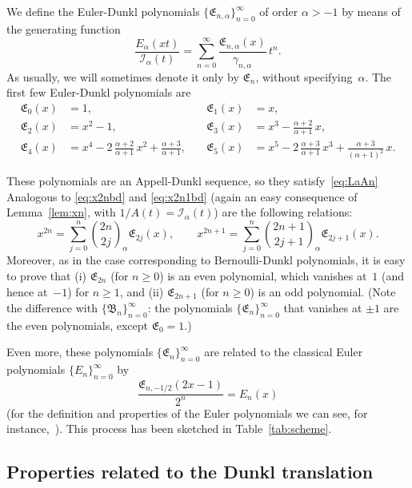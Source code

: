 \documentclass[10pt]{article}
\theoremstyle{plain}
\theoremstyle{definition}
\numberwithin{equation}{section} %
\newcommand{\Ea}{E_{\alpha}}
\newcommand{\binoma}[2]{\binom{#1}{#2}_{\!\alpha}}
\newcommand{\I}{\mathcal{I}}
\newcommand{\B}{\mathfrak{B}}
\newcommand{\E}{\mathfrak{E}}
\newcommand{\cc}{\gamma}
\begin{document}
We define the Euler-Dunkl polynomials $\{\E_{n,\alpha}\}_{n=0}^{\infty}$ of order $\alpha>-1$ by means of the generating function
\begin{equation*}
  \frac{\Ea(xt)}{\I_{\alpha}(t)}
  = \sum_{n=0}^\infty \frac{\E_{n,\alpha}(x)}{\cc_{n,\alpha}} \,t^n.
\end{equation*}
As usually, we will sometimes denote it only by $\E_{n}$, without specifying~$\alpha$.
The first few Euler-Dunkl polynomials are
\begin{align*}
  \E_0(x) &= 1, \quad & \E_1(x) &= x, \\
  \E_2(x) &= x^2-1, \quad &
  \E_3(x) &= x^3 - \frac{\alpha+2}{\alpha+1}\,x, \\
  \E_4(x) &= x^4 - 2\,\frac{\alpha+2}{\alpha+1}\,x^2 + \frac{\alpha+3}{\alpha+1},\quad &
  \E_5(x) &= x^5 - 2\,\frac{\alpha+3}{\alpha+1}\,x^3 + \frac{\alpha+3}{(\alpha+1)^2}\,x.
\end{align*}


These polynomials are an Appell-Dunkl sequence, so they satisfy~\eqref{eq:LaAn}
Analogous to \eqref{eq:x2nbd} and \eqref{eq:x2n1bd} (again an easy consequence of Lemma~\eqref{lem:xn}, with $1/A(t) = \I_{\alpha}(t)$) are the following relations:
\begin{equation}
\label{eq:x2ned}
  x^{2n} = \sum_{j=0}^{n} \binoma{2n}{2j} \E_{2j}(x),
  \qquad
  x^{2n+1} = \sum_{j=0}^{n} \binoma{2n+1}{2j+1} \E_{2j+1}(x).
\end{equation}
Moreover, as in the case corresponding to Bernoulli-Dunkl polynomials, it is easy to prove that
(i) $\E_{2n}$ (for $n\ge 0$) is an even polynomial, which vanishes at~$1$ (and hence at~$-1$) for $n\ge 1$, and
(ii) $\E_{2n+1}$ (for $n\ge 0$) is an odd polynomial.
(Note the difference with $\{\B_n\}_{n=0}^{\infty}$: the polynomials $\{\E_n\}_{n=0}^{\infty}$ that vanishes at $\pm 1$ are the even polynomials, except $\E_0=1$.)

Even more, these polynomials $\{\E_n\}_{n=0}^{\infty}$ are related to the classical Euler polynomials $\{E_n\}_{n=0}^{\infty}$ by
\begin{equation*}
  \frac{\E_{n,-1/2}(2x-1)}{2^n} = E_n(x)
\end{equation*}
(for the definition and properties of the Euler polynomials we can see, for instance,~\cite{Dil-NIST}).
This process has been sketched in Table~\ref{tab:scheme}.

\subsection{Properties related to the Dunkl translation }
\end{document}
